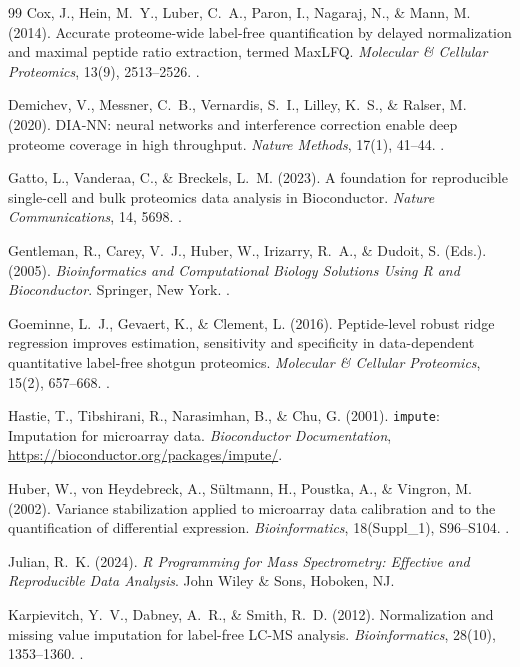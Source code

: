 \documentclass[11pt,oneside]{book}
\begin{document}
\begin{thebibliography}{99}
Cox, J., Hein, M.~Y., Luber, C.~A., Paron, I., Nagaraj, N., \& Mann, M. (2014). Accurate proteome-wide label-free quantification by delayed normalization and maximal peptide ratio extraction, termed MaxLFQ. \textit{Molecular \& Cellular Proteomics}, 13(9), 2513--2526. .

Demichev, V., Messner, C.~B., Vernardis, S.~I., Lilley, K.~S., \& Ralser, M. (2020). DIA-NN: neural networks and interference correction enable deep proteome coverage in high throughput. \textit{Nature Methods}, 17(1), 41--44. .

Gatto, L., Vanderaa, C., \& Breckels, L.~M. (2023). A foundation for reproducible single-cell and bulk proteomics data analysis in Bioconductor. \textit{Nature Communications}, 14, 5698. .

Gentleman, R., Carey, V.~J., Huber, W., Irizarry, R.~A., \& Dudoit, S. (Eds.). (2005). \textit{Bioinformatics and Computational Biology Solutions Using R and Bioconductor}. Springer, New York. .

Goeminne, L.~J., Gevaert, K., \& Clement, L. (2016). Peptide-level robust ridge regression improves estimation, sensitivity and specificity in data-dependent quantitative label-free shotgun proteomics. \textit{Molecular \& Cellular Proteomics}, 15(2), 657--668. .

Hastie, T., Tibshirani, R., Narasimhan, B., \& Chu, G. (2001). \texttt{impute}: Imputation for microarray data. \textit{Bioconductor Documentation}, \url{https://bioconductor.org/packages/impute/}.

Huber, W., von Heydebreck, A., S\"ultmann, H., Poustka, A., \& Vingron, M. (2002). Variance stabilization applied to microarray data calibration and to the quantification of differential expression. \textit{Bioinformatics}, 18(Suppl\_1), S96--S104. .

Julian, R.~K. (2024). \textit{R Programming for Mass Spectrometry: Effective and Reproducible Data Analysis}. John Wiley \& Sons, Hoboken, NJ.

Karpievitch, Y.~V., Dabney, A.~R., \& Smith, R.~D. (2012). Normalization and missing value imputation for label-free LC-MS analysis. \textit{Bioinformatics}, 28(10), 1353--1360. .


\end{thebibliography}
\end{document}
